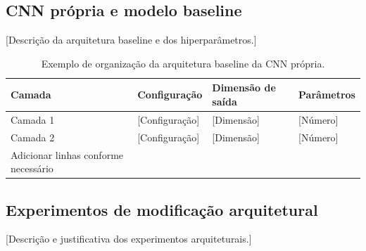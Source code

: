 \documentclass[10pt,a4paper]{article}
\begin{document}
\subsection{CNN própria e modelo baseline}

[Descrição da arquitetura baseline e dos hiperparâmetros.]

\begin{table}[H]
\centering
\caption{Exemplo de organização da arquitetura baseline da CNN própria.}
\label{tab:baseline}
\small
\begin{tabular}{llll}
\toprule
Camada & Configuração & Dimensão de saída & Parâmetros\\
\midrule
Camada 1 & [Configuração] & [Dimensão] & [Número]\\
Camada 2 & [Configuração] & [Dimensão] & [Número]\\
Adicionar linhas conforme necessário & & &\\
\bottomrule
\end{tabular}
\end{table}

\subsection{Experimentos de modificação arquitetural}

[Descrição e justificativa dos experimentos arquiteturais.]
\end{document}
